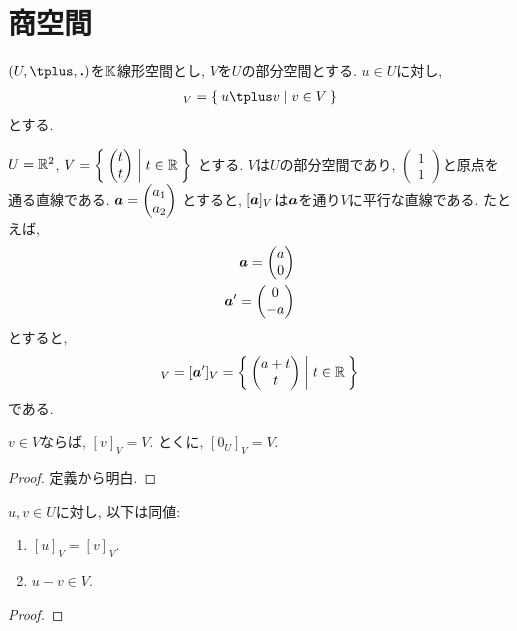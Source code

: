\section{商空間}
$(U,\plus,\act)$を$\mathbb{K}$線形空間とし,
$V$を$U$の部分空間とする.
$u\in U$に対し,
\begin{align*}
  [u]_V=\Set{u\plus v|v\in V}
\end{align*}
とする.
\begin{example}
$U=\mathbb{R}^2$, $V=\Set{\begin{pmatrix}t\\t\end{pmatrix}|t\in\mathbb{R}}$
  とする. $V$は$U$の部分空間であり,
  $\begin{pmatrix}1\\1\end{pmatrix}$と原点を通る直線である.
  $\boldsymbol{a}=\begin{pmatrix}a_1\\a_2\end{pmatrix}$
  とすると,
  $[\boldsymbol{a}]_V$は$\boldsymbol{a}$を通り$V$に平行な直線である.
  たとえば,
  \begin{align*}
    \boldsymbol{a}=\begin{pmatrix}a\\0\end{pmatrix}\\
    \boldsymbol{a}'=\begin{pmatrix}0\\-a\end{pmatrix}
  \end{align*}
  とすると,
  \begin{align*}
    [\aaa]_V=[\aaa']_V=\Set{\begin{pmatrix}a+t\\t\end{pmatrix}|t\in\RR}
  \end{align*}
  である.
  \begin{figure}\caption{}\end{figure}
\end{example}
\begin{lemma}
$v\in V$ならば, $[v]_V=V$.
とくに,  $[0_U]_V=V$.
\end{lemma}
\begin{proof}
定義から明白.
\end{proof}
\begin{lemma}
$u,v\in U$に対し, 以下は同値:
\begin{enumerate}
\item $[u]_V=[v]_V$.
\item $u-v \in V$.
\end{enumerate}
\end{lemma}
\begin{proof}\end{proof}

